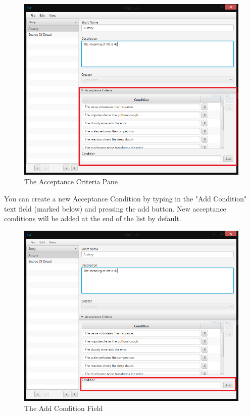 \begin{figure}[H]
\centering
\includegraphics[width=\textwidth]{images/screenshots/AcceptanceCriteria1.PNG}
\caption{The Acceptance Criteria Pane}
\label{fig:new_project}
\end{figure}

You can create a new Acceptance Condition by typing in the "Add Condition" text field (marked below) and pressing the add button. New acceptance conditions will be added at the end of the list by default.

\begin{figure}[H]
\centering
\includegraphics[width=\textwidth]{images/screenshots/AcceptanceCriteria2.PNG}
\caption{The Add Condition Field}
\label{fig:new_project}
\end{figure}

